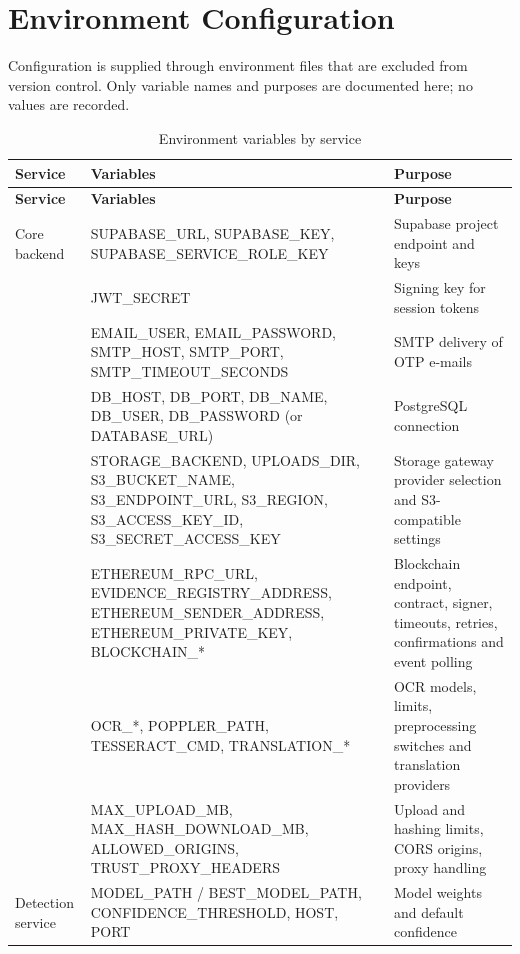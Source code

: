 \documentclass[12pt,a4paper,oneside]{report}
\begin{document}
\section{Environment Configuration}
Configuration is supplied through environment files that are excluded from version control. Only variable names and purposes are documented here; no values are recorded.

{\footnotesize
\setlength{\tabcolsep}{3pt}
\renewcommand{\arraystretch}{1.15}
\begin{longtable}{|>{\raggedright\arraybackslash}p{2.46cm}|>{\raggedright\arraybackslash}p{7.01cm}|>{\raggedright\arraybackslash}p{4.73cm}|}
\caption{Environment variables by service}\\
\hline
\rowcolor{headfill}\textbf{Service} & \textbf{Variables} & \textbf{Purpose} \\ \hline
\endfirsthead
\hline
\rowcolor{headfill}\textbf{Service} & \textbf{Variables} & \textbf{Purpose} \\ \hline
\endhead
\hline \endfoot
Core backend & SUPABASE\_URL, SUPABASE\_KEY, SUPABASE\_SERVICE\_ROLE\_KEY & Supabase project endpoint and keys \\ \hline
 & JWT\_SECRET & Signing key for session tokens \\ \hline
 & EMAIL\_USER, EMAIL\_PASSWORD, SMTP\_HOST, SMTP\_PORT, SMTP\_TIMEOUT\_SECONDS & SMTP delivery of OTP e-mails \\ \hline
 & DB\_HOST, DB\_PORT, DB\_NAME, DB\_USER, DB\_PASSWORD (or DATABASE\_URL) & PostgreSQL connection \\ \hline
 & STORAGE\_BACKEND, UPLOADS\_DIR, S3\_BUCKET\_NAME, S3\_ENDPOINT\_URL, S3\_REGION, S3\_ACCESS\_KEY\_ID, S3\_SECRET\_ACCESS\_KEY & Storage gateway provider selection and S3-compatible settings \\ \hline
 & ETHEREUM\_RPC\_URL, EVIDENCE\_REGISTRY\_ADDRESS, ETHEREUM\_SENDER\_ADDRESS, ETHEREUM\_PRIVATE\_KEY, BLOCKCHAIN\_* & Blockchain endpoint, contract, signer, timeouts, retries, confirmations and event polling \\ \hline
 & OCR\_*, POPPLER\_PATH, TESSERACT\_CMD, TRANSLATION\_* & OCR models, limits, preprocessing switches and translation providers \\ \hline
 & MAX\_UPLOAD\_MB, MAX\_HASH\_DOWNLOAD\_MB, ALLOWED\_ORIGINS, TRUST\_PROXY\_HEADERS & Upload and hashing limits, CORS origins, proxy handling \\ \hline
Detection service & MODEL\_PATH / BEST\_MODEL\_PATH, CONFIDENCE\_THRESHOLD, HOST, PORT & Model weights and default confidence \\ \hline

\end{longtable}}
\end{document}

